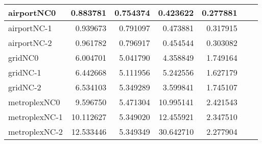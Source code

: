 \begin{longtable}{|l|r|r|r|r|r|r|}
airportNC0 & 0.883781 & 0.754374 & 0.423622 & 0.277881 \\ \hline
airportNC-1 & 0.939673 & 0.791097 & 0.473881 & 0.317915 \\ \hline
airportNC-2 & 0.961782 & 0.796917 & 0.454544 & 0.303082 \\ \hline
gridNC0 & 6.004701 & 5.041790 & 4.358849 & 1.749164 \\ \hline
gridNC-1 & 6.442668 & 5.111956 & 5.242556 & 1.627179 \\ \hline
gridNC-2 & 6.534103 & 5.349289 & 3.599841 & 1.745107 \\ \hline
metroplexNC0 & 9.596750 & 5.471304 & 10.995141 & 2.421543 \\ \hline
metroplexNC-1 & 10.112627 & 5.349020 & 12.455921 & 2.347510 \\ \hline
metroplexNC-2 & 12.533446 & 5.349349 & 30.642710 & 2.277904 \\ \hline
\end{longtable}

